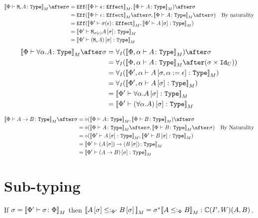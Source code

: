 \documentclass{report}
\newcommand{\allI}[0]{\forall_I}
\newcommand\type[0]{\texttt{Type}}
\newcommand\effect[0]{\texttt{Effect}}
\newcommand\cipw[0]{\C(I', W)}
\newcommand\Eff[0]{\texttt{Eff}}
\renewcommand\star[0]{^*}
\begin{document}
\begin{align}
    \deno{\typerelation{\P}{\mea}{\type}}\after\si & =  \Eff(\deno{\typerelation{\P}{\e}{\effect}}, \deno{\typerelation{\P}{A}{\type}})\after\si \\
    & = \Eff(\deno{\typerelation{\P}{\e}{\effect}}\after\si, \deno{\typerelation{\P}{A}{\type}}\after\si) \qt{By naturality}\\
    & = \Eff(\deno{\typerelation{\P'}{\si(\e)}{\effect}}, \deno{\typerelation{\P'}{A\ssi}{\type}})\\
    & = \deno{\typerelation{\P'}{\M{\si(\e)}{A\ssi}}{\type}}\\
    & = \deno{\typerelation{\P'}{(\mea)\ssi}{\type}}
\end{align}
    \begin{align}
        \deno{\typerelation{\P}{\all{\a}A}{\type}}\after\si & = \allI(\deno{\typerelation{\P,\a}{A}{\type}})\after\si\\
        & = \allI(\deno{\typerelation{\P,\a}{A}{\type}}\after(\si\times\Id{U}))\\
        & = \allI(\deno{\typerelation{\P',\a}{A\sub{\si, \a\setto\e}}{\type}})\\
        & = \allI(\deno{\typerelation{\P',\a}{A\ssi}{\type}})\\
        & = \deno{\typerelation{\P'}{\all{\a}{A\ssi}}{\type}}\\
        & = \deno{\typerelation{\P'}{(\all{\a}{A})\ssi}{\type}}\\
    \end{align}

\begin{align}
    \deno{\typerelation{\P}{\ab}{\type}}\after\si &= \diamond(\deno{\typerelation{\P}{A}{\type}},\deno{\typerelation{\P}{B}{\type}})\after\si\\
    &= \diamond(\deno{\typerelation{\P}{A}{\type}}\after\si,\deno{\typerelation{\P}{B}{\type}}\after\si)\qt{By Naturality}\\
    & = \diamond(\deno{\typerelation{\P'}{A\ssi}{\type}},\deno{\typerelation{\P'}{B\ssi}{\type}})\\
    & = \deno{\typerelation{\P'}{\fntype{(A\ssi)}{(B\ssi)}}{\type}}\\
    & = \deno{\typerelation{\P'}{(\ab)\ssi}{\type}}\\
\end{align}

\section{Sub-typing}
If $\sigma = {\bf [\![}\Phi' \vdash \sigma \colon \Phi{\bf ]\!]}_M$ then $\deno{A\ssi\subtypepp B\ssi} = \si\star\deno{A\subtypep B}: \cipw(A, B)$.
\end{document}
